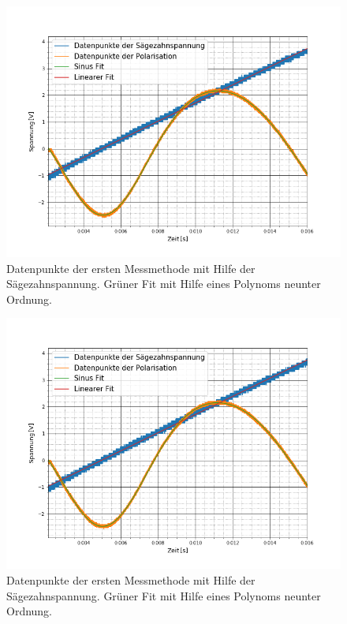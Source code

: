 \begin{figure}[ht]
	\includegraphics[scale=0.5]{Bild/V1_13}
	\centering
	\caption[Plot zu Versuchsteil 1 Nr.13]{Datenpunkte der ersten Messmethode mit Hilfe der Sägezahnspannung. Grüner Fit mit Hilfe eines Polynoms neunter Ordnung.}
\end{figure}
\begin{figure}[ht]
	\includegraphics[scale=0.5]{Bild/V1_14}
	\centering
	\caption[Plot zu Versuchsteil 1 Nr.14]{Datenpunkte der ersten Messmethode mit Hilfe der Sägezahnspannung. Grüner Fit mit Hilfe eines Polynoms neunter Ordnung.}
\end{figure}
